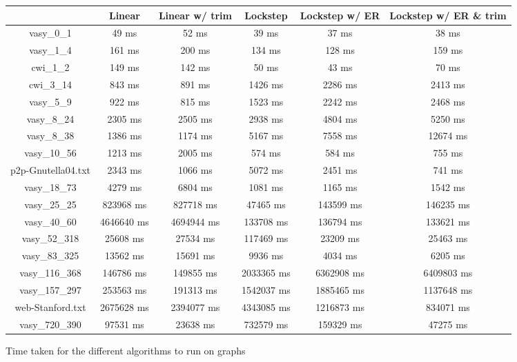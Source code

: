 \documentclass[../master/master.tex]{subfiles}
\begin{document}
\begin{figure}
\begin{tabular}{ |c||c||c||c||c||c|| } 
\hline
  & Linear & Linear w/ trim & Lockstep & Lockstep w/ ER & Lockstep w/ ER \& trim \\
\hline
 vasy\_0\_1 & 49 ms & 52 ms & 39 ms & 37 ms & 38 ms \\
\hline
 vasy\_1\_4 & 161 ms & 200 ms & 134 ms & 128 ms & 159 ms \\
\hline
 cwi\_1\_2 & 149 ms & 142 ms & 50 ms & 43 ms & 70 ms \\
\hline
 cwi\_3\_14 & 843 ms & 891 ms & 1426 ms & 2286 ms & 2413 ms \\
\hline
 vasy\_5\_9 & 922 ms & 815 ms & 1523 ms & 2242 ms & 2468 ms \\
\hline
 vasy\_8\_24 & 2305 ms & 2505 ms & 2938 ms & 4804 ms & 5250 ms \\
\hline
 vasy\_8\_38 & 1386 ms & 1174 ms & 5167 ms & 7558 ms & 12674 ms \\
\hline
 vasy\_10\_56 & 1213 ms & 2005 ms & 574 ms & 584 ms & 755 ms \\
\hline
 p2p-Gnutella04.txt & 2343 ms & 1066 ms & 5072 ms & 2451 ms & 741 ms \\
\hline
 vasy\_18\_73 & 4279 ms & 6804 ms & 1081 ms & 1165 ms & 1542 ms \\
\hline
 vasy\_25\_25 & 823968 ms & 827718 ms & 47465 ms & 143599 ms & 146235 ms \\
\hline
 vasy\_40\_60 & 4646640 ms & 4694944 ms & 133708 ms & 136794 ms & 133621 ms \\
\hline
 vasy\_52\_318 & 25608 ms & 27534 ms & 117469 ms & 23209 ms & 25463 ms \\
\hline
 vasy\_83\_325 & 13562 ms & 15691 ms & 9936 ms & 4034 ms & 6205 ms \\
\hline
 vasy\_116\_368 & 146786 ms & 149855 ms & 2033365 ms & 6362908 ms & 6409803 ms \\
\hline
 vasy\_157\_297 & 253563 ms & 191313 ms & 1542037 ms & 1885465 ms & 1137648 ms \\
\hline
 web-Stanford.txt & 2675628 ms & 2394077 ms & 4343085 ms & 1216873 ms & 834071 ms \\
\hline
 vasy\_720\_390 & 97531 ms & 23638 ms & 732579 ms & 159329 ms & 47275 ms \\
\hline
\end{tabular}
\caption{Time taken for the different algorithms to run on graphs}\label{timeres}
\end{figure}
\end{document}
